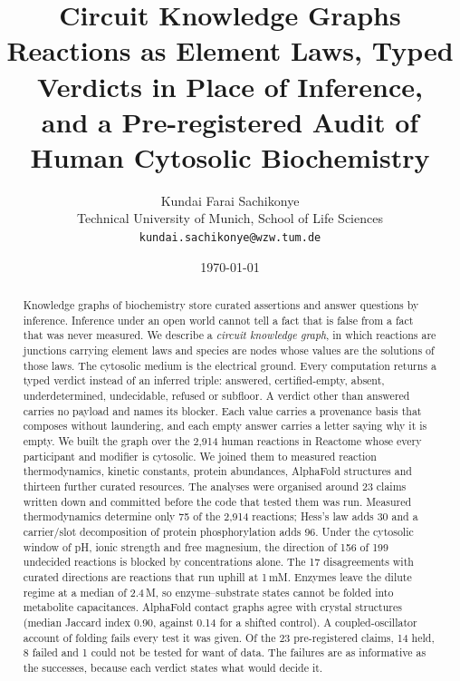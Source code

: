 \documentclass[11pt,a4paper]{article}
\theoremstyle{remark}
\newcommand{\vd}[1]{\textsf{#1}}
\begin{document}
\title{\textbf{Circuit Knowledge Graphs}\\[6pt]
{\Large Reactions as Element Laws, Typed Verdicts in Place of Inference,\\ and a Pre-registered Audit of Human Cytosolic Biochemistry}}

\author{
Kundai Farai Sachikonye\\
Technical University of Munich, School of Life Sciences\\
\texttt{kundai.sachikonye@wzw.tum.de}
}

\date{\today}

\maketitle

\begin{abstract}
\noindent
Knowledge graphs of biochemistry store curated assertions and answer questions by inference.
Inference under an open world cannot tell a fact that is false from a fact that was never measured.
We describe a \emph{circuit knowledge graph}, in which reactions are junctions carrying element laws and species are nodes whose values are the solutions of those laws.
The cytosolic medium is the electrical ground.
Every computation returns a typed verdict instead of an inferred triple: \vd{answered}, \vd{certified-empty}, \vd{absent}, \vd{underdetermined}, \vd{undecidable}, \vd{refused} or \vd{subfloor}.
A verdict other than \vd{answered} carries no payload and names its blocker.
Each value carries a provenance basis that composes without laundering, and each empty answer carries a letter saying why it is empty.
We built the graph over the 2{,}914 human reactions in Reactome whose every participant and modifier is cytosolic.
We joined them to measured reaction thermodynamics, kinetic constants, protein abundances, AlphaFold structures and thirteen further curated resources.
The analyses were organised around 23 claims written down and committed before the code that tested them was run.
Measured thermodynamics determine only 75 of the 2{,}914 reactions; Hess's law adds 30 and a carrier/slot decomposition of protein phosphorylation adds 96.
Under the cytosolic window of pH, ionic strength and free magnesium, the direction of 156 of 199 undecided reactions is blocked by concentrations alone.
The 17 disagreements with curated directions are reactions that run uphill at 1\,mM.
Enzymes leave the dilute regime at a median of 2.4\,\textmu M, so enzyme--substrate states cannot be folded into metabolite capacitances.
AlphaFold contact graphs agree with crystal structures (median Jaccard index 0.90, against 0.14 for a shifted control).
A coupled-oscillator account of folding fails every test it was given.
Of the 23 pre-registered claims, 14 held, 8 failed and 1 could not be tested for want of data.
The failures are as informative as the successes, because each verdict states what would decide it.
\end{abstract}
\end{document}
